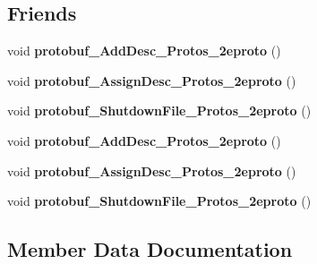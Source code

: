 \subsection*{Friends}
\begin{DoxyCompactItemize}
\item 
\mbox{\label{classruntime_1_1FileSendProtos_ae10616842f51ae52b59c40d2393fc939}} 
void {\bfseries protobuf\+\_\+\+Add\+Desc\+\_\+\+Protos\+\_\+2eproto} ()
\item 
\mbox{\label{classruntime_1_1FileSendProtos_adb7ebfa843677cabd6e050c0a818aaa8}} 
void {\bfseries protobuf\+\_\+\+Assign\+Desc\+\_\+\+Protos\+\_\+2eproto} ()
\item 
\mbox{\label{classruntime_1_1FileSendProtos_a52fc8399a5f56aa162db2eb9f615dd97}} 
void {\bfseries protobuf\+\_\+\+Shutdown\+File\+\_\+\+Protos\+\_\+2eproto} ()
\item 
\mbox{\label{classruntime_1_1FileSendProtos_ae10616842f51ae52b59c40d2393fc939}} 
void {\bfseries protobuf\+\_\+\+Add\+Desc\+\_\+\+Protos\+\_\+2eproto} ()
\item 
\mbox{\label{classruntime_1_1FileSendProtos_adb7ebfa843677cabd6e050c0a818aaa8}} 
void {\bfseries protobuf\+\_\+\+Assign\+Desc\+\_\+\+Protos\+\_\+2eproto} ()
\item 
\mbox{\label{classruntime_1_1FileSendProtos_a52fc8399a5f56aa162db2eb9f615dd97}} 
void {\bfseries protobuf\+\_\+\+Shutdown\+File\+\_\+\+Protos\+\_\+2eproto} ()
\end{DoxyCompactItemize}


\subsection{Member Data Documentation}
\mbox{\label{classruntime_1_1FileSendProtos_aaf83019abf759a48dd045d340c1a3875}} 
